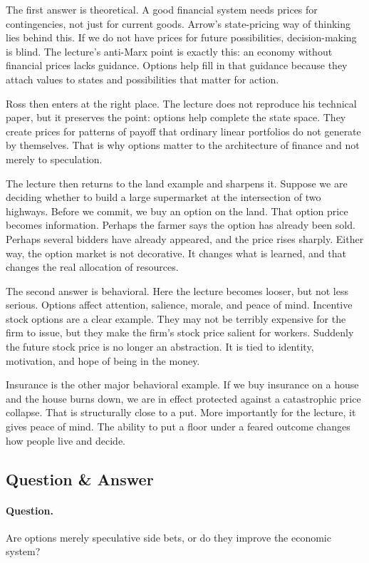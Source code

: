 The first answer is theoretical. A good financial system needs prices for contingencies, not just for current goods. Arrow's state-pricing way of thinking lies behind this. If we do not have prices for future possibilities, decision-making is blind. The lecture's anti-Marx point is exactly this: an economy without financial prices lacks guidance. Options help fill in that guidance because they attach values to states and possibilities that matter for action.

Ross then enters at the right place. The lecture does not reproduce his technical paper, but it preserves the point: options help complete the state space. They create prices for patterns of payoff that ordinary linear portfolios do not generate by themselves. That is why options matter to the architecture of finance and not merely to speculation.

The lecture then returns to the land example and sharpens it. Suppose we are deciding whether to build a large supermarket at the intersection of two highways. Before we commit, we buy an option on the land. That option price becomes information. Perhaps the farmer says the option has already been sold. Perhaps several bidders have already appeared, and the price rises sharply. Either way, the option market is not decorative. It changes what is learned, and that changes the real allocation of resources.

The second answer is behavioral. Here the lecture becomes looser, but not less serious. Options affect attention, salience, morale, and peace of mind. Incentive stock options are a clear example. They may not be terribly expensive for the firm to issue, but they make the firm's stock price salient for workers. Suddenly the future stock price is no longer an abstraction. It is tied to identity, motivation, and hope of being in the money.

Insurance is the other major behavioral example. If we buy insurance on a house and the house burns down, we are in effect protected against a catastrophic price collapse. That is structurally close to a put. More importantly for the lecture, it gives peace of mind. The ability to put a floor under a feared outcome changes how people live and decide.

\subsection{Question \& Answer}

\paragraph{Question.} Are options merely speculative side bets, or do they improve the economic system?

